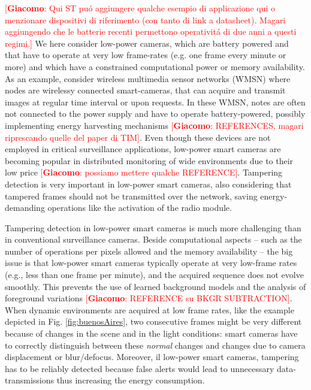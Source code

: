\documentclass{llncs}
\newcommand{\gi}[1]{{\textcolor{red}{[\small \textbf{Giacomo}: #1]}}}
\begin{document}
\gi{Qui ST pu\'o aggiungere qualche esempio di applicazione qui o menzionare dispositivi di riferimento (con tanto di link a datasheet). Magari aggiungendo che le batterie recenti permettono operativit\'a di due anni a questi regimi.}
We here consider low-power cameras, which are battery powered and that have to operate at very low frame-rates (e.g. one frame every minute or more) and which have a constrained computational power or memory availability. As an example, consider wireless multimedia sensor networks (WMSN) \cite{akyildiz2007survey} where nodes are wirelessy connected smart-cameras, that can acquire and transmit images at regular time interval or upon requests. In these WMSN, notes are often not connected to the power supply and have to operate battery-powered, possibly implementing energy harvesting mechanisms \gi{REFERENCES, magari riprescando quelle del paper di TIM}. Even though these devices are not employed in critical surveillance applications, low-power smart cameras are becoming popular in distributed monitoring of wide environments due to their low price \gi{possiamo mettere qualche REFERENCE}. Tampering detection is very important in low-power smart cameras, also considering that tampered frames should not be transmitted over the network, saving energy-demanding operations like the activation of the radio module. 

Tampering detection in low-power smart cameras is much more challenging than in conventional surveillance cameras. Beside computational aspects -- such as the number of operations per pixels allowed and the memory availability -- the big issue is that low-power smart cameras typically operate at very low-frame rates (e.g., less than one frame per minute), and the acquired sequence does not evolve smoothly. This prevents the use of learned background models and the analysis of foreground variations \gi{REFERENCE su BKGR SUBTRACTION}. When dynamic environments are acquired at low frame rates, like the example depicted in Fig. \ref{fig:buenosAires}, two consecutive frames might be very different because of changes in the scene and in the light conditions: smart cameras have to correctly distinguish between these \emph{normal} changes and changes due to camera displacement or blur/defocus. Moreover, il low-power smart cameras, tampering has to be reliably detected because false alerts would lead to unnecessary data-transmissions thus increasing the energy consumption.

\end{document}
